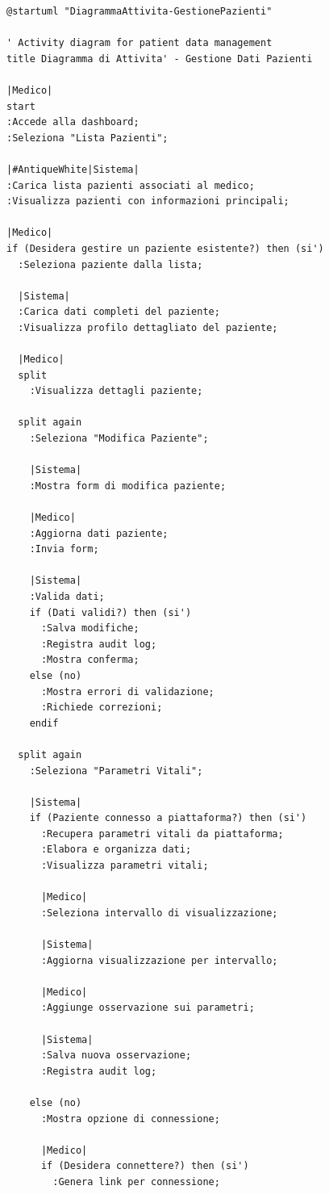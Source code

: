 \documentclass[12pt,a4paper,oneside]{report}
\begin{document}
\begin{lstlisting}[basicstyle=\small\ttfamily, breaklines=true, caption={gestione del paziente}]
@startuml "DiagrammaAttivita-GestionePazienti"

' Activity diagram for patient data management
title Diagramma di Attivita' - Gestione Dati Pazienti

|Medico|
start
:Accede alla dashboard;
:Seleziona "Lista Pazienti";

|#AntiqueWhite|Sistema|
:Carica lista pazienti associati al medico;
:Visualizza pazienti con informazioni principali;

|Medico|
if (Desidera gestire un paziente esistente?) then (si')
  :Seleziona paziente dalla lista;
  
  |Sistema|
  :Carica dati completi del paziente;
  :Visualizza profilo dettagliato del paziente;
  
  |Medico|
  split
    :Visualizza dettagli paziente;
    
  split again
    :Seleziona "Modifica Paziente";
    
    |Sistema|
    :Mostra form di modifica paziente;
    
    |Medico|
    :Aggiorna dati paziente;
    :Invia form;
    
    |Sistema|
    :Valida dati;
    if (Dati validi?) then (si')
      :Salva modifiche;
      :Registra audit log;
      :Mostra conferma;
    else (no)
      :Mostra errori di validazione;
      :Richiede correzioni;
    endif
    
  split again
    :Seleziona "Parametri Vitali";
    
    |Sistema|
    if (Paziente connesso a piattaforma?) then (si')
      :Recupera parametri vitali da piattaforma;
      :Elabora e organizza dati;
      :Visualizza parametri vitali;
      
      |Medico|
      :Seleziona intervallo di visualizzazione;
      
      |Sistema|
      :Aggiorna visualizzazione per intervallo;
      
      |Medico|
      :Aggiunge osservazione sui parametri;
      
      |Sistema|
      :Salva nuova osservazione;
      :Registra audit log;
      
    else (no)
      :Mostra opzione di connessione;
      
      |Medico|
      if (Desidera connettere?) then (si')
        :Genera link per connessione;
        

\end{lstlisting}
\end{document}
